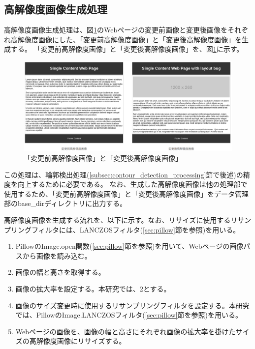 \subsection{高解像度画像生成処理}\label{subsec:Generate_high_images}
高解像度画像生成処理は、図\ref{fig: img_high_original_bf_af}のWebページの変更前画像と変更後画像をそれぞれ高解像度画像にした、「変更前高解像度画像」と「変更後高解像度画像」を生成する。
「変更前高解像度画像」と「変更後高解像度画像」を、図\ref{fig: img_high_original_bf_af}に示す。
\begin{figure}[tp]
    \begin{center}
        \includegraphics[width=1.0\columnwidth]{image/4_img_high_original_bf_af.png}
        \caption{「変更前高解像度画像」と「変更後高解像度画像」}
        \label{fig: img_high_original_bf_af}
    \end{center}
\end{figure}
この処理は、輪郭検出処理(\ref{subsec:contour_detection_processing}節で後述)の精度を向上するために必要である。
なお、生成した高解像度画像は他の処理部で使用するため、「変更前高解像度画像」と「変更後高解像度画像」をデータ管理部のbase\_dirディレクトリに出力する。
\par
高解像度画像を生成する流れを、以下に示す。なお、リサイズに使用するリサンプリングフィルタには、LANCZOSフィルタ(\ref{sec:pillow}節を参照)を用いる。
\begin{enumerate}
    \item PillowのImage.open関数(\ref{sec:pillow}節を参照)を用いて、Webページの画像パスから画像を読み込む。
    \item 画像の幅と高さを取得する。
    \item 画像の拡大率を設定する。本研究では、$2$とする。
    \item 画像のサイズ変更時に使用するリサンプリングフィルタを設定する。本研究では、PillowのImage.LANCZOSフィルタ(\ref{sec:pillow}節を参照)を用いる。
    \item Webページの画像を、画像の幅と高さにそれぞれ画像の拡大率を掛けたサイズの高解像度画像にリサイズする。
\end{enumerate}


